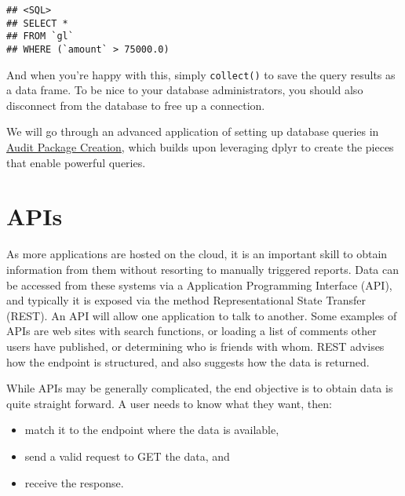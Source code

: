 \documentclass[
]{book}
\newenvironment{Shaded}{\begin{snugshade}}{\end{snugshade}}
\newcommand{\KeywordTok}[1]{\textcolor[rgb]{0.13,0.29,0.53}{\textbf{#1}}}
\newcommand{\NormalTok}[1]{#1}
\newcommand{\OperatorTok}[1]{\textcolor[rgb]{0.81,0.36,0.00}{\textbf{#1}}}
\newcommand{\StringTok}[1]{\textcolor[rgb]{0.31,0.60,0.02}{#1}}
\providecommand{\tightlist}{%
  \setlength{\itemsep}{0pt}\setlength{\parskip}{0pt}}
\begin{document}
\begin{verbatim}
## <SQL>
## SELECT *
## FROM `gl`
## WHERE (`amount` > 75000.0)
\end{verbatim}

And when you're happy with this, simply \texttt{collect()} to save the query results as a data frame. To be nice to your database administrators, you should also disconnect from the database to free up a connection.

\begin{Shaded}
\end{Shaded}

We will go through an advanced application of setting up database queries in \protect\hyperlink{auditpackage}{Audit Package Creation}, which builds upon leveraging dplyr to create the pieces that enable powerful queries.

\hypertarget{apis}{%
\section{APIs}\label{apis}}

As more applications are hosted on the cloud, it is an important skill to obtain information from them without resorting to manually triggered reports. Data can be accessed from these systems via a Application Programming Interface (API), and typically it is exposed via the method Representational State Transfer (REST). An API will allow one application to talk to another. Some examples of APIs are web sites with search functions, or loading a list of comments other users have published, or determining who is friends with whom. REST advises how the endpoint is structured, and also suggests how the data is returned.

While APIs may be generally complicated, the end objective is to obtain data is quite straight forward. A user needs to know what they want, then:

\begin{itemize}
\tightlist
\item
  match it to the endpoint where the data is available,
\item
  send a valid request to GET the data, and
\item
  receive the response.
\end{itemize}
\end{document}
